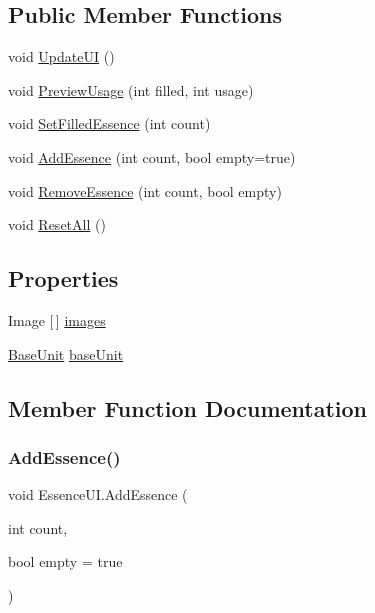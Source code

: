 \subsection*{Public Member Functions}
\begin{DoxyCompactItemize}
\item 
void \mbox{\hyperlink{class_essence_u_i_a26023c3d4977188014384a1a40eb3ad9}{Update\+UI}} ()
\item 
void \mbox{\hyperlink{class_essence_u_i_abe39202e5f4c5134bd6a16ddfd8bb017}{Preview\+Usage}} (int filled, int usage)
\item 
void \mbox{\hyperlink{class_essence_u_i_aac12f1c82310ceb94e259d9b6aa9bdfd}{Set\+Filled\+Essence}} (int count)
\item 
void \mbox{\hyperlink{class_essence_u_i_a1fd3a11e5b47cd87758d337fe1f61384}{Add\+Essence}} (int count, bool empty=true)
\item 
void \mbox{\hyperlink{class_essence_u_i_a39b3c1ec97a29130e2e8ab4050921ed6}{Remove\+Essence}} (int count, bool empty)
\item 
void \mbox{\hyperlink{class_essence_u_i_a82a6c20070b4fd052eae20ba6e05487b}{Reset\+All}} ()
\end{DoxyCompactItemize}
\subsection*{Properties}
\begin{DoxyCompactItemize}
\item 
Image \mbox{[}$\,$\mbox{]} \mbox{\hyperlink{class_essence_u_i_a08b6afcc69283f73676b25f7d3faea16}{images}}
\item 
\mbox{\hyperlink{class_base_unit}{Base\+Unit}} \mbox{\hyperlink{class_essence_u_i_aa0f4e2e07a1b90d6656dbbbf34a459fe}{base\+Unit}}
\end{DoxyCompactItemize}


\subsection{Member Function Documentation}
\mbox{\label{class_essence_u_i_a1fd3a11e5b47cd87758d337fe1f61384}} 
\subsubsection{\texorpdfstring{AddEssence()}{AddEssence()}}
{\footnotesize\ttfamily void Essence\+U\+I.\+Add\+Essence (\begin{DoxyParamCaption}\item[{int}]{count,  }\item[{bool}]{empty = {\ttfamily true} }\end{DoxyParamCaption})}

